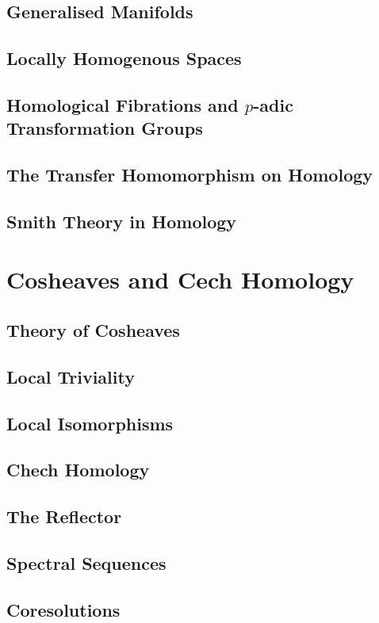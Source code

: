 \subsection{Generalised Manifolds}
\subsection{Locally Homogenous Spaces}
\subsection{Homological Fibrations and $p$-adic Transformation Groups}
\subsection{The Transfer Homomorphism on Homology}
\subsection{Smith Theory in Homology}

\section{Cosheaves and Cech Homology}
\subsection{Theory of Cosheaves}
\subsection{Local Triviality}
\subsection{Local Isomorphisms}
\subsection{Chech Homology}
\subsection{The Reflector}
\subsection{Spectral Sequences}
\subsection{Coresolutions}
